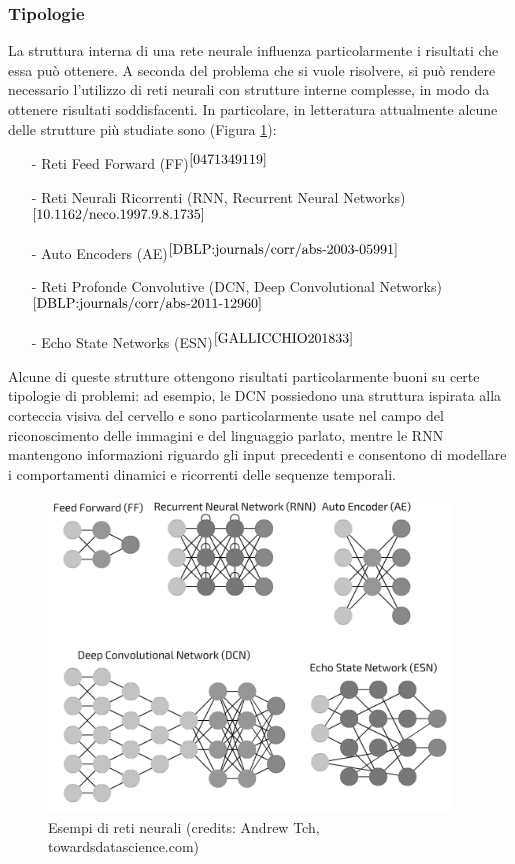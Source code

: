 \subsubsection{Tipologie} La struttura interna di una rete neurale influenza particolarmente i risultati che essa può ottenere. A seconda del problema che si vuole risolvere, si può rendere necessario l'utilizzo di reti neurali con strutture interne complesse, in modo da ottenere risultati soddisfacenti. In particolare, in letteratura attualmente alcune delle strutture più studiate sono (Figura \ref{fig:tipologiereti}):
\begin{itemize}
    \item[-] Reti Feed Forward (FF)$^{\cite{0471349119}}$
    \item[-] Reti Neurali Ricorrenti (RNN, Recurrent Neural Networks)$^{\cite{10.1162/neco.1997.9.8.1735}}$
    \item[-] Auto Encoders (AE)$^{\cite{DBLP:journals/corr/abs-2003-05991}}$
    \item[-] Reti Profonde Convolutive (DCN, Deep Convolutional Networks)$^{\cite{DBLP:journals/corr/abs-2011-12960}}$
    \item[-] Echo State Networks (ESN)$^{\cite{GALLICCHIO201833}}$
\end{itemize}
Alcune di queste strutture ottengono risultati particolarmente buoni su certe tipologie di problemi: ad esempio, le DCN possiedono una struttura ispirata alla corteccia visiva del cervello e sono particolarmente usate nel campo del riconoscimento delle immagini e del linguaggio parlato, mentre le RNN mantengono informazioni riguardo gli input precedenti e consentono di modellare i comportamenti dinamici e ricorrenti delle sequenze temporali.
\begin{figure}[h]
	\begin{center}
		\includegraphics[width=0.95\textwidth]{img/tipologiereti.png}
		\caption{Esempi di reti neurali (credits: Andrew Tch, towardsdatascience.com)}
		\label{fig:tipologiereti}
	\end{center}
\end{figure}

